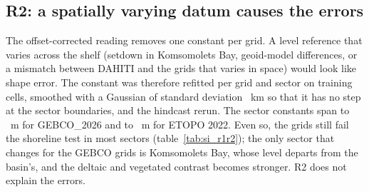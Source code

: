 \subsection*{R2: a spatially varying datum causes the errors}
The offset-corrected reading removes one constant per grid. A level reference that varies across the shelf (setdown in Komsomolets Bay, geoid-model differences, or a mismatch between DAHITI and the grids that varies in space) would look like shape error. The constant was therefore refitted per grid and sector on training cells, smoothed with a Gaussian of standard deviation ~km so that it has no step at the sector boundaries, and the hindcast rerun. The sector constants span  to ~m for GEBCO\_2026 and  to ~m for ETOPO 2022. Even so, the grids still fail the shoreline test in most sectors (table~\ref{tab:si_r1r2}); the only sector that changes for the GEBCO grids is Komsomolets Bay, whose level departs from the basin's, and the deltaic and vegetated contrast becomes stronger. R2 does not explain the errors.

